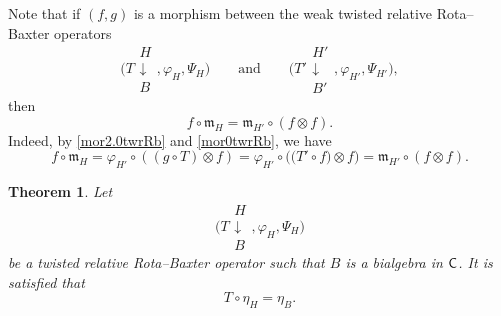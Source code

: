 \documentclass[pdftex]{sigma}
\numberwithin{equation}{section}
\newtheorem{Theorem}{Theorem}[section]
\begin{document}
\begin{Remark}
Note that if $(f,g)$ is a morphism between the weak twisted relative Rota--Baxter operators
\[
\Biggl(T\begin{array}{c}H\\\downarrow\\B\end{array},\varphi_{H},\Psi_{H}\Biggl) \qquad \text{and}\qquad \Biggl(T'\begin{array}{c}H'\\\downarrow\\B'\end{array},\varphi_{H'},\Psi_{H'}\Biggr),
\]
then \begin{equation}\label{mor2twrRb}
f\circ\mathfrak{m}_{H}=\mathfrak{m}_{H'}\circ(f\otimes f).
\end{equation}
Indeed, by \eqref{mor2.0twrRb} and \eqref{mor0twrRb}, we have
\[f\circ\mathfrak{m}_{H}=\varphi_{H'}\circ((g\circ T)\otimes f)=\varphi_{H'}\circ\bigl(\bigl(T'\circ f\bigr)\otimes f\bigr)=\mathfrak{m}_{H'}\circ(f\otimes f).
\]
\end{Remark}
\begin{Theorem}%
Let
\[
\Biggl(T\begin{array}{c}H\\\downarrow\\B\end{array},\varphi_{H},\Psi_{H}\Biggl)
\]
 be a twisted relative Rota--Baxter operator such that $B$ is a bialgebra in ${\sf C}$. It is satisfied that
\begin{equation}\label{etaT}
T\circ\eta_{H}=\eta_{B}.
\end{equation}
\end{Theorem}
\end{document}
